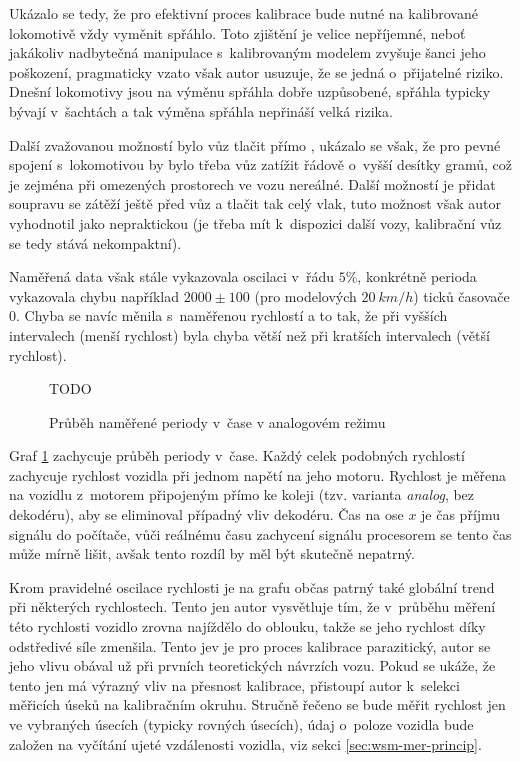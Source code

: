 Ukázalo se tedy, že pro efektivní proces kalibrace bude nutné na kalibrované
lokomotivě vždy vyměnit spřáhlo. Toto zjištění je velice nepříjemné, neboť
jakákoliv nadbytečná manipulace s~kalibrovaným modelem zvyšuje šanci jeho
poškození, pragmaticky vzato však autor usuzuje, že se jedná o~přijatelné
riziko. Dnešní lokomotivy jsou na výměnu spřáhla dobře uzpůsobené, spřáhla
typicky bývají v~šachtách a tak výměna spřáhla nepřináší velká rizika.

Další zvažovanou možností bylo vůz tlačit přímo ,
ukázalo se však, že pro pevné spojení s~lokomotivou by bylo třeba vůz zatížit
řádově o~vyšší desítky gramů, což je zejména při omezených prostorech ve vozu
nereálné. Další možností je přidat soupravu se zátěží ještě před vůz a tlačit
tak celý vlak, tuto možnost však autor vyhodnotil jako nepraktickou (je třeba
mít k~dispozici další vozy, kalibrační vůz se tedy stává nekompaktní).

Naměřená data však stále vykazovala oscilaci v~řádu $5 \%$, konkrétně perioda
vykazovala chybu například $2000 \pm 100$ (pro modelových $20\ km/h$) ticků
časovače 0. Chyba se navíc měnila s~naměřenou rychlostí a to tak, že při
vyšších intervalech (menší rychlost) byla chyba větší než při kratších
intervalech (větší rychlost).

\begin{figure}[h]
TODO
\caption{Průběh naměřené periody v~čase v analogovém režimu}
\label{fig:speed-analog}
\end{figure}

Graf \ref{fig:speed-analog} zachycuje průběh periody v~čase. Každý celek
podobných rychlostí zachycuje rychlost vozidla při jednom napětí na jeho
motoru. Rychlost je měřena na vozidlu z~motorem připojeným přímo ke koleji
(tzv. varianta \textit{analog}, bez dekodéru), aby se eliminoval případný vliv
dekodéru.  Čas na ose $x$ je čas příjmu signálu do počítače, vůči reálnému času
zachycení signálu procesorem se tento čas může mírně lišit, avšak tento rozdíl
by měl být skutečně nepatrný.

Krom pravidelné oscilace rychlosti je na grafu občas patrný také globální
 trend při některých rychlostech. Tento jen autor vysvětluje tím,
že v~průběhu měření této rychlosti vozidlo zrovna najíždělo do oblouku, takže
se jeho rychlost díky odstředivé síle zmenšila. Tento jev je pro proces
kalibrace parazitický, autor se jeho vlivu obával už při prvních teoretických
návrzích vozu. Pokud se ukáže, že tento jen má výrazný vliv na přesnost
kalibrace, přistoupí autor k~selekci měřicích úseků na kalibračním okruhu.
Stručně řečeno se bude měřit rychlost jen ve vybraných úsecích (typicky rovných
úsecích), údaj o~poloze vozidla bude založen na vyčítání ujeté vzdálenosti
vozidla, viz sekci \ref{sec:wsm-mer-princip}.

